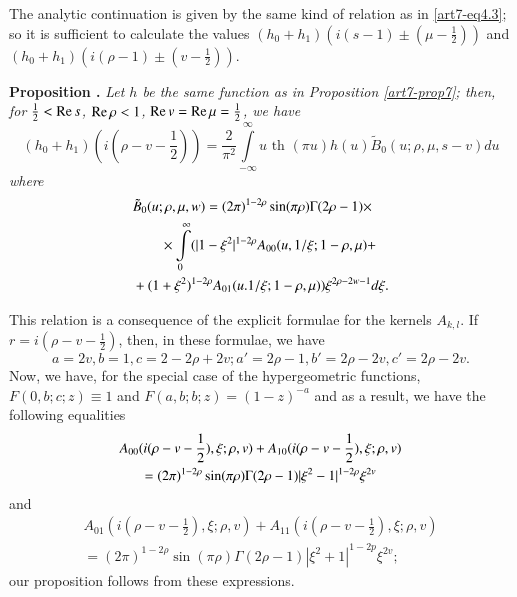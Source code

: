 The analytic continuation is given by the same kind of relation as in \eqref{art7-eq4.3}; so it is sufficient to calculate the values $(h_0 + h_1)(i (s-1) \pm (\mu - \frac{1}{2} ))$ and  $(h_0 + h_1) (i(\rho -1) \pm (v - \frac{1}{2}))$.

\medskip
\noindent
{\bfseries Proposition .\label{art7-prop9}}
\textit{Let $h$ be the same function as in Proposition \eqref{art7-prop7}; then, for $\frac{1}{2} < \operatorname{Re} s$, $\operatorname{Re} \rho < 1$, $\operatorname{Re} v = \operatorname{Re} \mu = \frac{1}{2}$, we have}
\begin{equation}
(h_0 + h_1) (i(\rho - v - \frac{1}{2})) = \frac{2}{\pi^2} \int\limits^\infty_{-\infty} u \text{ th } (\pi u) h(u) \tilde{B}_0 (u; \rho, \mu, s -v) du \label{art7-eq4.15}
\end{equation}
\textit{where}
\begin{align}
& \tilde{B}_0 (u; \rho, \mu, w) = (2\pi)^{1-2\rho} \sin (\pi \rho) \Gamma  (2 \rho - 1) \times \label{art7-eq4.16}\\
& \qquad \times  \int\limits^\infty_{0} (|1-\xi^{2}|^{1-2 \rho} A_{00} (u, 1 / \xi; 1 -  \rho, \mu) + \notag\\
& + (1+ \xi^2)^{1-2\rho} A_{01} (u. 1/\xi; 1- \rho, \mu)) \xi^{2\rho - 2 w-1} d \xi. \notag
\end{align}\pageoriginale

This relation is a consequence of the explicit formulae for the kernels $A_{k,l}$. If $r = i (\rho - v - \frac{1}{2})$, then, in these formulae, we have
$$
a = 2 v , b =1, c = 2-2\rho + 2 v; a'=2\rho -1, b' =2 \rho - 2 v , c' = 2 \rho - 2 v. 
$$
Now, we have, for the special case of the hypergeometric functions, $F(0, b; c; z) \equiv 1$ and $F(a, b; b; z) = (1-z)^{-a}$ and as a result, we have the following equalities 
\begin{gather}
A_{00} (i(\rho - v - \frac{1}{2}), \xi; \rho, v) + A_{10}  (i( \rho - v - \frac{1}{2}) , \xi ; \rho, v)\label{art7-eq4.17}\\
= (2\pi)^{1-2\rho} \sin (\pi \rho) \Gamma (2 \rho -1) |\xi^{2} -1|^{1-2\rho} \xi^{2v} \notag
\end{gather}
and 
\begin{gather*}
A_{01} (i( \rho - v - \frac{1}{2}), \xi ; \rho, v) + A_{11} (i(\rho - v -\frac{1}{2}), \xi; \rho, v)\\
= (2\pi)^{1-2\rho} \sin (\pi \rho) \Gamma (2\rho -1) |\xi^2+1|^{1-2p} \xi^{2v};  
\end{gather*}
our proposition follows from these expressions.

\setcounter{section}{2}
\setcounter{subsection}{3}
